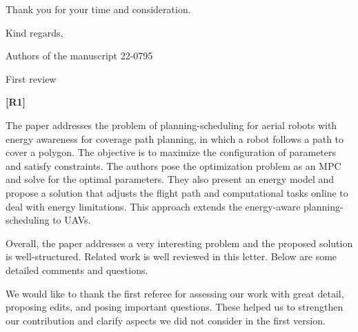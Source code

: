 \documentclass[10pt]{letter}
\begin{document}
Thank you for your time and consideration. 

\vspace{1em}


\noindent Kind regards, 

\begin{flushright}
Authors of the manuscript 22-0795\,\,\,\,\,\,\,\,\,\,\,\,\,\,\,\\
\end{flushright}

\vspace{5em}

\newpage 

{First review}

\vspace{3em}

{\hspace*{-4.5em}\textbf{[R1]}\vspace*{-1.9em}}

The paper addresses the problem of planning-scheduling for aerial robots with energy awareness for coverage path planning, in which a robot follows a path to cover a polygon. The objective is to maximize the configuration of parameters and satisfy constraints. The authors pose the optimization problem as an MPC and solve for the optimal parameters. They also present an energy model and propose a solution that adjusts the flight path and computational tasks online to deal with energy limitations. This approach extends the energy-aware planning-scheduling to UAVs.

Overall, the paper addresses a very interesting problem and the proposed solution is well-structured.
Related work is well reviewed in this letter. Below are some detailed comments and questions.

{\color{blue}

{\hspace*{-4.5em}{[R1]}\vspace*{-1.9em}}

We would like to thank the first referee for assessing our work with great detail, proposing edits, and posing important questions. These helped us to strengthen our contribution and clarify aspects we did not consider in the first version.

}
\end{document}
